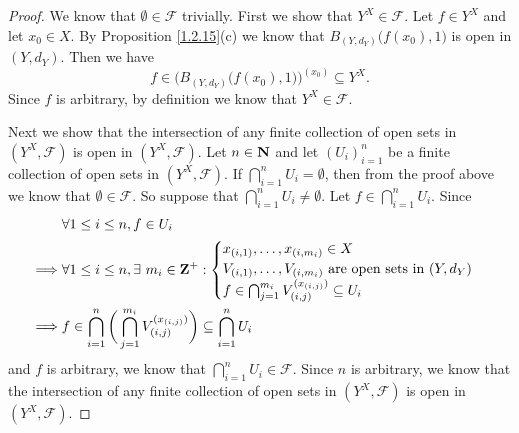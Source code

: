 \begin{proof}
    We know that \(\emptyset \in \mathcal{F}\) trivially.
    First we show that \(Y^X \in \mathcal{F}\).
    Let \(f \in Y^X\) and let \(x_0 \in X\).
    By Proposition \ref{1.2.15}(c) we know that \(B_{(Y, d_Y)}\big(f(x_0), 1\big)\) is open in \((Y, d_Y)\).
    Then we have
    \[
        f \in \Big(B_{(Y, d_Y)}\big(f(x_0), 1\big)\Big)^{(x_0)} \subseteq Y^X.
    \]
    Since \(f\) is arbitrary, by definition we know that \(Y^X \in \mathcal{F}\).

    Next we show that the intersection of any finite collection of open sets in \((Y^X, \mathcal{F})\) is open in \((Y^X, \mathcal{F})\).
    Let \(n \in \mathbf{N}\) and let \((U_i)_{i = 1}^n\) be a finite collection of open sets in \((Y^X, \mathcal{F})\).
    If \(\bigcap_{i = 1}^n U_i = \emptyset\), then from the proof above we know that \(\emptyset \in \mathcal{F}\).
    So suppose that \(\bigcap_{i = 1}^n U_i \neq \emptyset\).
    Let \(f \in \bigcap_{i = 1}^n U_i\).
    Since
    \begin{align*}
                 & \forall 1 \leq i \leq n, f \in U_i                                                                                  \\
        \implies & \forall 1 \leq i \leq n, \exists\ m_i \in \mathbf{Z}^+ : \begin{cases}
                                                                        x_{(i, 1)}, \dots, x_{(i, m_i)} \in X                              \\
                                                                        V_{(i, 1)}, \dots, V_{(i, m_i)} \text{ are open sets in } (Y, d_Y) \\
                                                                        f \in \bigcap_{j = 1}^{m_i} V_{(i, j)}^{(x_{(i, j)})} \subseteq U_i
                                                                    \end{cases} \\
        \implies & f \in \bigcap_{i = 1}^n \bigg(\bigcap_{j = 1}^{m_i} V_{(i, j)}^{(x_{(i, j)})}\bigg) \subseteq \bigcap_{i = 1}^n U_i
    \end{align*}
    and \(f\) is arbitrary, we know that \(\bigcap_{i = 1}^n U_i \in \mathcal{F}\).
    Since \(n\) is arbitrary, we know that the intersection of any finite collection of open sets in \((Y^X, \mathcal{F})\) is open in \((Y^X, \mathcal{F})\).


\end{proof}
